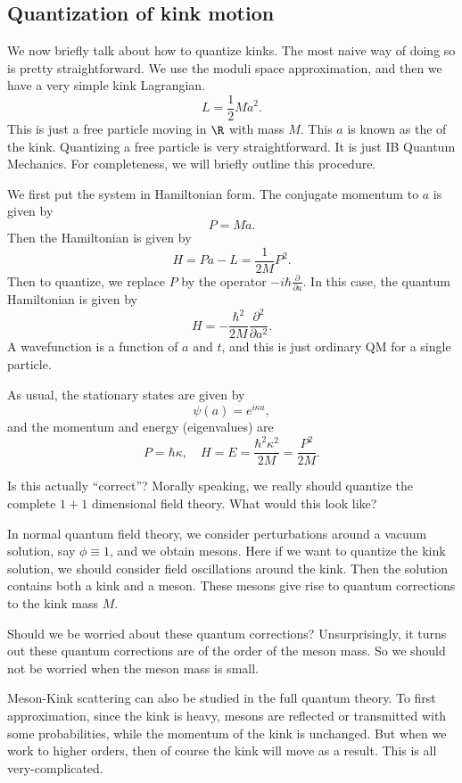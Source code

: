\documentclass[a4paper]{article}
\begin{document}
\subsection{Quantization of kink motion}
We now briefly talk about how to quantize kinks. The most naive way of doing so is pretty straightforward. We use the moduli space approximation, and then we have a very simple kink Lagrangian.
\[
  L = \frac{1}{2} M \dot{a}^2.
\]
This is just a free particle moving in $\R$ with mass $M$. This $a$ is known as the  of the kink. Quantizing a free particle is very straightforward. It is just IB Quantum Mechanics. For completeness, we will briefly outline this procedure.

We first put the system in Hamiltonian form. The conjugate momentum to $a$ is given by
\[
  P = M \dot{a}.
\]
Then the Hamiltonian is given by
\[
  H = P \dot{a} - L = \frac{1}{2M} P^2.
\]
Then to quantize, we replace $P$ by the operator $-i\hbar \frac{\partial}{\partial a}$. In this case, the quantum Hamiltonian is given by
\[
  H = - \frac{\hbar^2}{2M} \frac{\partial^2}{\partial a^2}.
\]
A wavefunction is a function of $a$ and $t$, and this is just ordinary QM for a single particle.

As usual, the stationary states are given by
\[
  \psi(a) = e^{i\kappa a},
\]
and the momentum and energy (eigenvalues) are
\[
  P = \hbar \kappa,\quad H = E = \frac{\hbar^2 \kappa^2}{2M} = \frac{P^2}{2M}.
\]

Is this actually ``correct''? Morally speaking, we really should quantize the complete $1 + 1$ dimensional field theory. What would this look like?

In normal quantum field theory, we consider perturbations around a vacuum solution, say $\phi \equiv 1$, and we obtain mesons. Here if we want to quantize the kink solution, we should consider field oscillations around the kink. Then the solution contains both a kink and a meson. These mesons give rise to quantum corrections to the kink mass $M$.

Should we be worried about these quantum corrections? Unsurprisingly, it turns out these quantum corrections are of the order of the meson mass. So we should not be worried when the meson mass is small.

Meson-Kink scattering can also be studied in the full quantum theory. To first approximation, since the kink is heavy, mesons are reflected or transmitted with some probabilities, while the momentum of the kink is unchanged. But when we work to higher orders, then of course the kink will move as a result. This is all very-complicated.
\end{document}
